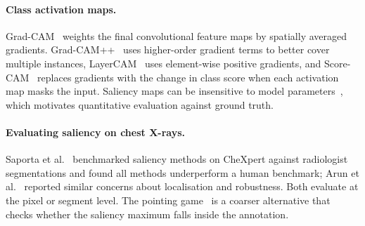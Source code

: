 \documentclass[pdflatex,sn-mathphys-num]{sn-jnl}
\begin{document}
\paragraph{Class activation maps.} Grad-CAM~\cite{selvaraju2017gradcam} weights the final convolutional feature maps by spatially averaged gradients. Grad-CAM++~\cite{chattopadhay2018gradcampp} uses higher-order gradient terms to better cover multiple instances, LayerCAM~\cite{jiang2021layercam} uses element-wise positive gradients, and Score-CAM~\cite{wang2020scorecam} replaces gradients with the change in class score when each activation map masks the input. Saliency maps can be insensitive to model parameters~\cite{adebayo2018sanity}, which motivates quantitative evaluation against ground truth.

\paragraph{Evaluating saliency on chest X-rays.} Saporta et al.~\cite{saporta2022benchmarking} benchmarked saliency methods on CheXpert against radiologist segmentations and found all methods underperform a human benchmark; Arun et al.~\cite{arun2021trustworthiness} reported similar concerns about localisation and robustness. Both evaluate at the pixel or segment level. The pointing game~\cite{zhang2018pointing} is a coarser alternative that checks whether the saliency maximum falls inside the annotation.
\end{document}
